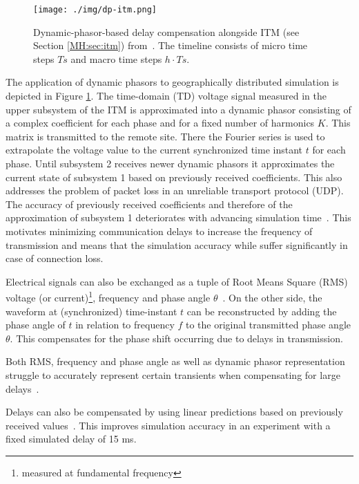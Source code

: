 \documentclass[a4paper]{atseminar}
\begin{document}
\begin{figure}[h]
 \centering
  \texttt{[image: ./img/dp-itm.png]}
    \caption{Dynamic-phasor-based delay compensation alongside ITM (see Section \ref{MH:sec:itm}) from~\cite{stevic2017europe}. The timeline consists of micro time steps $Ts$ and macro time steps $h\cdot Ts$. }
 \label{MH:fig:dp}
\end{figure}

The application of dynamic phasors to geographically distributed simulation is depicted in Figure \ref{MH:fig:dp}. 
The time-domain (TD) voltage signal measured in the upper subsystem of the ITM is approximated into a dynamic phasor consisting of a complex coefficient for each phase and for a fixed number of harmonics $K$.  This matrix is transmitted to the remote site.
There the Fourier series is used to extrapolate the voltage value to the current synchronized time instant $t$ for each phase. Until subsystem 2 receives newer dynamic phasors it approximates the current state of subsystem 1 based on previously received coefficients. This also addresses the problem of packet loss in an unreliable transport protocol (UDP). The accuracy of previously received coefficients and therefore of the approximation of subsystem 1 deteriorates with advancing simulation time~\cite{stevic2017fidelity}. This motivates minimizing communication delays to increase the frequency of transmission and means that the simulation accuracy while suffer significantly in case of connection loss.

Electrical signals can also be exchanged as a tuple of Root Means Square (RMS) voltage (or current)\footnote{measured at fundamental frequency}, frequency and phase angle  $\theta$~\cite{stevic2017fidelity}. On the other side, the waveform at (synchronized) time-instant $t$ can be reconstructed by adding the phase angle of $t$ in relation to frequency $f$ to the original transmitted phase angle $\theta$. This compensates for the phase shift occurring due to delays in transmission. 


Both RMS, frequency and phase angle as well as dynamic phasor representation struggle to accurately represent certain transients when compensating for large delays~\cite{stevic2017fidelity}.


Delays can also be compensated by using linear predictions based on previously received values~\cite{liu2016}. This improves simulation accuracy in an experiment with a fixed simulated delay of 15 ms.
\end{document}
